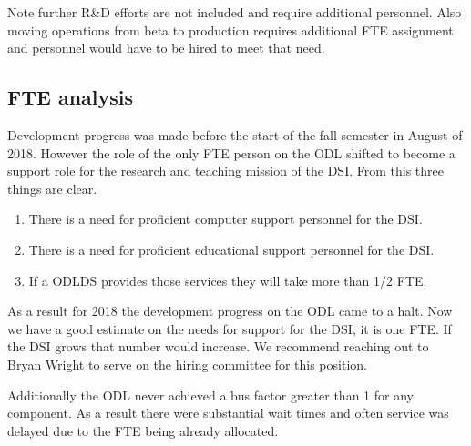 Note further R\&D efforts are not included and require additional personnel. Also moving operations from beta to production requires additional FTE assignment and personnel would have to be hired to meet that need.

\subsection{FTE analysis}
Development progress was made before the start of the fall semester in August of 2018. However the role of the only FTE person on the ODL shifted to become a support role for the research and teaching mission of the DSI. From this three things are clear. 
\begin{enumerate}
\item There is a need for proficient computer support personnel for the DSI.
\item There is a need for proficient educational support personnel for the DSI.
\item If a ODLDS provides those services they will take more than 1/2 FTE.
\end{enumerate}
As a result for 2018 the development progress on the ODL came to a halt. Now we have a good estimate on the needs for support for the DSI, it is one FTE. If the DSI grows that number would increase. We recommend reaching out to Bryan Wright to serve on the hiring committee for this position.

Additionally the ODL never achieved a bus factor greater than 1 for any component. As a result there were substantial wait times and often service was delayed due to the FTE being already allocated.

